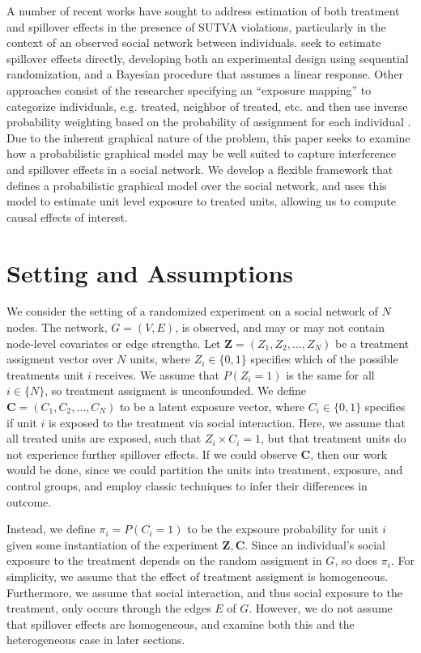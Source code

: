 \documentclass{article}
\begin{document}
A number of recent works have sought to address estimation of both treatment and spillover effects in the presence of SUTVA violations, particularly in the context of an observed social network between individuals. \cite{pmlr-v28-toulis13} seek to estimate spillover effects directly, developing both 
an experimental design using sequential randomization, and a Bayesian procedure that assumes a linear response. Other approaches consist of the researcher specifying an ``exposure mapping'' to categorize individuals, e.g. treated, neighbor of treated, etc. and then use 
inverse probability weighting based on the probability of assignment for each individual \cite{Aronow}. Due to the inherent graphical nature of the problem, this paper seeks to examine how a probabilistic graphical model may be well 
suited to capture interference and spillover effects in a social network. We develop a flexible framework that defines a probabilistic graphical model over the social network, and uses this model to estimate unit level exposure to treated units, 
allowing us to compute causal effects of interest. 

\section{Setting and Assumptions}

We consider the setting of a randomized experiment on a social network of $N$ nodes. The network, $G = (V, E)$, is observed, and may or may not contain node-level covariates or edge strengths. 
Let $\mathbf{Z} = (Z_1, Z_2, \dots ,Z_N)$ be a treatment assigment vector over $N$ units, where $Z_i \in \{0, 1\}$ specifies which of the possible treatments unit $i$ receives. 
We assume that $P(Z_i = 1)$ is the same for all $i \in \{N\}$, so treatment assigment is unconfounded. We define $\mathbf{C} = (C_1, C_2, \dots, C_N)$ to be a latent exposure vector, where $C_i \in \{0, 1\}$ specifies if unit $i$ is exposed to the treatment via social interaction. 
Here, we assume that all treated units are exposed, such that $Z_i \times C_i = 1$, but that treatment units do not experience further spillover effects. %
If we could observe $\mathbf{C}$, then our work would be done, since we could partition the units into treatment, exposure, and control groups, and employ classic techniques to infer their differences in outcome. 

Instead, we define $\pi_i = P(C_i = 1)$ to be the expsoure probability for unit $i$ given some instantiation of the experiment $\mathbf{Z}, \mathbf{C}$. Since an individual's social exposure to the treatment depends on the random assigment in $G$, so does $\pi_i$. For simplicity, we assume that
the effect of treatment assigment is homogeneous. Furthermore, we assume that social interaction, and thus social exposure to the treatment, only occurs through the edges $E$ of $G$. However, we do not assume that spillover effects are homogeneous, and examine both this and the heterogeneous case in later sections.
\end{document}
